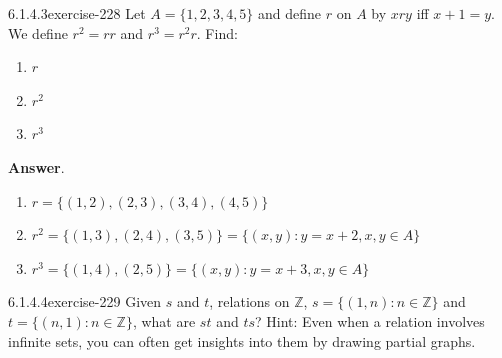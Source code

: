\documentclass[twoside,10pt,]{book}
\numberwithin{equation}{section}
\begin{document}
\begin{divisionsolution}{6.1.4.3}{}{exercise-228}%
\hypertarget{p-1967}{}%
Let \(A = \{1,2,3,4,5\}\) and define \(r\) on \(A\) by \(x r y\) iff \(x + 1 = y\). We define \(r^2 = r r\) and \(r^3 = r^2 r\). Find:\leavevmode%
\begin{enumerate}[label=(\alph*)]
\item\hypertarget{li-1049}{}\hypertarget{p-1968}{}%
\(r\)%
\item\hypertarget{li-1050}{}\hypertarget{p-1969}{}%
\(r^2\)%
\item\hypertarget{li-1051}{}\hypertarget{p-1970}{}%
\(r^3\)%
\end{enumerate}
%
\par\smallskip%
\noindent\textbf{Answer}.\quad%
\hypertarget{p-1971}{}%
\leavevmode%
\begin{enumerate}[label=(\alph*)]
\item\hypertarget{li-1052}{}\hypertarget{p-1972}{}%
\(r=\{(1,2), (2,3), (3,4), (4,5)\}\)%
\item\hypertarget{li-1053}{}\hypertarget{p-1973}{}%
\(r^2 = \{(1,3), (2,4), (3,5)\}=\{(x,y) : y=x+2, x,y\in A\}\)%
\item\hypertarget{li-1054}{}\hypertarget{p-1974}{}%
\(r^3=\{(1,4), (2,5)\}=\{(x,y) : y=x+3, x,y \in  A\}\)%
\end{enumerate}
%
\end{divisionsolution}%
\begin{divisionsolution}{6.1.4.4}{}{exercise-229}%
\hypertarget{p-1975}{}%
Given \(s\) and \(t\), relations on \(\mathbb{Z}\), \(s = \{(1, n) : n \in \mathbb{Z}\}\) and \(t= \{(n, 1) : n \in  \mathbb{Z}\}\), what are \(st\) and \(ts\)? Hint: Even when a relation involves infinite sets, you can often get insights into them by drawing partial graphs.%
\end{divisionsolution}%
\end{document}
